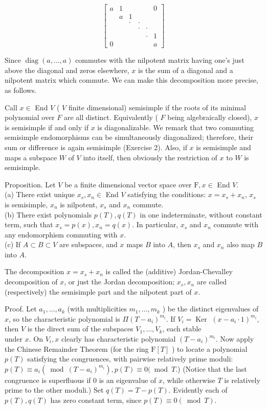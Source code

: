 \documentclass[10pt]{article}
\begin{document}
$$
\left[\begin{array}{cccccc}
a & 1 & & & & 0 \\
& a & 1 & & & \\
& & \cdot & \cdot & & \\
& & & \cdot & \cdot & \\
& & & & \cdot & 1 \\
0 & & & & & a
\end{array}\right]
$$

Since $\operatorname{diag}(a, \ldots, a)$ commutes with the nilpotent matrix having one's just above the diagonal and zeros elsewhere, $x$ is the sum of a diagonal and a nilpotent matrix which commute. We can make this decomposition more precise, as follows.

Call $x \in$ End $V$ ( $V$ finite dimensional) semisimple if the roots of its minimal polynomial over $F$ are all distinct. Equivalently ( $F$ being algebraically closed), $x$ is semisimple if and only if $x$ is diagonalizable. We remark that two commuting semisimple endomorphisms can be simultaneously diagonalized; therefore, their sum or difference is again semisimple (Exercise 2). Also, if $x$ is semisimple and maps a subspace $W$ of $V$ into itself, then obviously the restriction of $x$ to $W$ is semisimple.

Proposition. Let $V$ be a finite dimensional vector space over $\mathrm{F}, x \in$ End $V$.\\
(a) There exist unique $x_{s}, x_{n} \in$ End $V$ satisfying the conditions: $x=x_{s}+x_{n}$, $x_{s}$ is semisimple, $x_{n}$ is nilpotent, $x_{s}$ and $x_{n}$ commute.\\
(b) There exist polynomials $p(T), q(T)$ in one indeterminate, without constant term, such that $x_{s}=p(x), x_{n}=q(x)$. In particular, $x_{s}$ and $x_{n}$ commute with any endomorphism commuting with $x$.\\
(c) If $A \subset B \subset V$ are subspaces, and $x$ maps $B$ into $A$, then $x_{s}$ and $x_{n}$ also map $B$ into $A$.

The decomposition $x=x_{s}+x_{n}$ is called the (additive) Jordan-Chevalley decomposition of $x$, or just the Jordan decomposition; $x_{s}, x_{n}$ are called (respectively) the semisimple part and the nilpotent part of $x$.

Proof. Let $a_{1}, \ldots, a_{k}$ (with multiplicities $m_{1}, \ldots, m_{k}$ ) be the distinct eigenvalues of $x$, so the characteristic polynomial is $\Pi\left(T-a_{i}\right)^{m_{i}}$. If $V_{i}=\operatorname{Ker}$ $\left(x-a_{i} \cdot 1\right)^{m_{i}}$, then $V$ is the direct sum of the subspaces $V_{1}, \ldots, V_{k}$, each stable\\
under $x$. On $V_{i}, x$ clearly has characteristic polynomial $\left(T-a_{i}\right)^{m_{i}}$. Now apply the Chinese Remainder Theorem (for the ring $\mathrm{F}[T]$ ) to locate a polynomial $p(T)$ satisfying the congruences, with pairwise relatively prime moduli: $p(T) \equiv a_{i}\left(\bmod \left(T-a_{i}\right)^{m_{i}}\right), p(T) \equiv 0(\bmod T$.) (Notice that the last congruence is superfluous if 0 is an eigenvalue of $x$, while otherwise $T$ is relatively prime to the other moduli.) Set $q(T)=T-p(T)$. Evidently each of $p(T), q(T)$ has zero constant term, since $p(T) \equiv 0(\bmod T)$.
\end{document}

